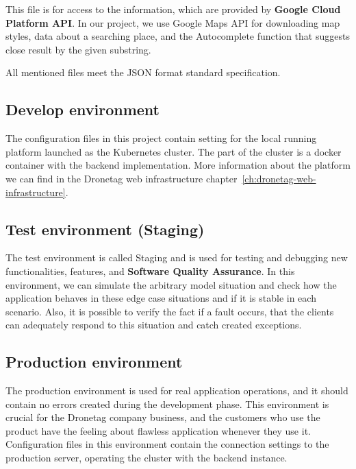 This file is for access to the information, which are provided by \textbf{Google Cloud Platform API}.
In our project, we use Google Maps API for downloading map styles, data about a searching place, and the Autocomplete function that suggests close result by the given substring.

All mentioned files meet the JSON format standard specification.


\subsection{Develop environment}\label{subsec:develop-environment}
The configuration files in this project contain setting for the local running platform launched as the Kubernetes cluster.
The part of the cluster is a docker container with the backend implementation.
More information about the platform we can find in the Dronetag web infrastructure chapter~\ref{ch:dronetag-web-infrastructure}.


\subsection{Test environment (Staging)}\label{subsec:test-environment}
The test environment is called Staging and is used for testing and debugging new functionalities, features, and \textbf{Software Quality Assurance}.\cite{sqa}
In this environment, we can simulate the arbitrary model situation and check how the application behaves in these edge case situations and if it is stable in each scenario.
Also, it is possible to verify the fact if a fault occurs, that the clients can adequately respond to this situation and catch created exceptions.


\subsection{Production environment}\label{subsec:production-environment}
The production environment is used for real application operations, and it should contain no errors created during the development phase.
This environment is crucial for the Dronetag company business, and the customers who use the product have the feeling about flawless application whenever they use it.
Configuration files in this environment contain the connection settings to the production server, operating the cluster with the backend instance.
